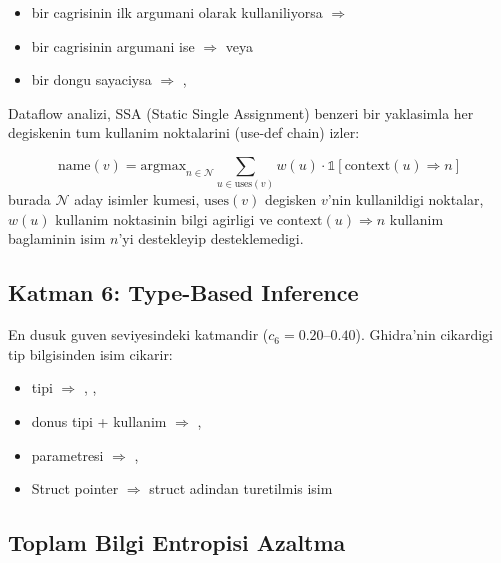 \begin{itemize}
  \item {} bir  cagrisinin ilk argumani olarak
        kullaniliyorsa $\Rightarrow$ 
  \item {} bir  cagrisinin argumani ise
        $\Rightarrow$  veya 
  \item {} bir dongu sayaciysa $\Rightarrow$ , 
\end{itemize}

Dataflow analizi, SSA (Static Single Assignment) benzeri bir yaklasimla
her degiskenin tum kullanim noktalarini (use-def chain) izler:

\begin{equation}
  \text{name}(v) = \text{argmax}_{n \in \mathcal{N}}
    \sum_{u \in \text{uses}(v)} w(u) \cdot \mathbb{1}[\text{context}(u) \Rightarrow n]
  \label{eq:dataflow-naming}
\end{equation}
burada $\mathcal{N}$ aday isimler kumesi, $\text{uses}(v)$ degisken $v$'nin
kullanildigi noktalar, $w(u)$ kullanim noktasinin bilgi agirligi ve
$\text{context}(u) \Rightarrow n$ kullanim baglaminin isim $n$'yi
destekleyip desteklemedigi.


\subsection{Katman 6: Type-Based Inference}
\label{subsec:layer6-type}

En dusuk guven seviyesindeki katmandir ($c_6 = 0.20$--$0.40$).
Ghidra'nin cikardigi tip bilgisinden isim cikarir:

\begin{itemize}
  \item {} tipi $\Rightarrow$ , , 
  \item {} donus tipi +  kullanim $\Rightarrow$ , 
  \item {} parametresi $\Rightarrow$ , 
  \item Struct pointer $\Rightarrow$ struct adindan turetilmis isim
\end{itemize}

\subsection{Toplam Bilgi Entropisi Azaltma}
\label{subsec:total-entropy}

